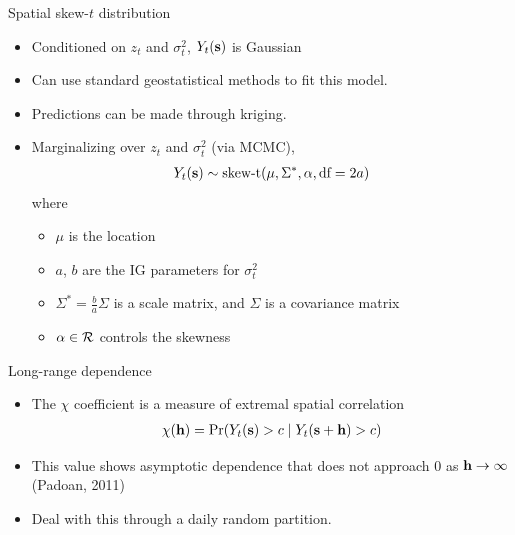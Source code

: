 \documentclass{beamer}
\begin{document}
\begin{frame}{Spatial skew-$t$ distribution}
  \begin{itemize} \setlength{\itemsep}{0.5em}
    \item \alert{Conditioned} on $z_t$ and $\sigma^2_t$, $Y_t(\mbox{\bf s})$ is Gaussian
    \item Can use standard geostatistical methods to fit this model.
    \item Predictions can be made through kriging.
    \item \alert{Marginalizing} over $z_t$ and $\sigma^2_t$ (via MCMC),
    \begin{align*}
      Y_t(\mbox{\bf s}) \sim \text{skew-t}(\mu, \Sigma^*, \alpha, \text{df}=2a)
    \end{align*}
    where
    \begin{itemize}
    	\item $\mu$ is the location
	\item $a$, $b$ are the IG parameters for $\sigma^2_t$
	\item $\Sigma^* = \frac{ b }{ a } \Sigma$ is a scale matrix, and $\Sigma$ is a \Matern covariance matrix
	\item $\alpha \in {\cal R}$ controls the skewness
    \end{itemize}
  \end{itemize}
\end{frame}

\begin{frame}{Long-range dependence}
  \begin{itemize} \setlength{\itemsep}{0.5em}
    \item The $\chi$ coefficient is a measure of extremal spatial correlation
    \begin{align*}
      \chi(\mbox{\bf h}) = \Pr(Y_t(\mbox{\bf s}) > c \mid Y_t(\mbox{\bf s} + \mbox{\bf h}) > c)
    \end{align*}
    \item This value shows asymptotic dependence that does not approach 0 as $\mbox{\bf h} \rightarrow \infty$ (Padoan, 2011)
    \item Deal with this through a daily random partition.
  \end{itemize}
\end{frame}
\end{document}
